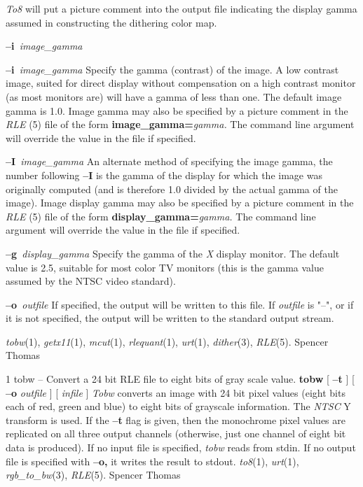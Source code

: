 {\it To8}
will put a picture comment into the output file indicating the display
gamma assumed in constructing the dithering color map.
\begin{TPlist}{{\bf --i}{\it \ image\_gamma}
}
\item[{{\bf --i}{\it \ image\_gamma}
}]
Specify the gamma (contrast) of the image.  A low contrast image,
suited for direct display without compensation on a high contrast
monitor (as most monitors are) will have a gamma of less than one.
The default image gamma is 1.0.  Image gamma may also be specified by
a picture comment in the
{\it RLE} (5)
file of the form
{\bf image\_gamma=}{\it gamma.}
The command line argument will override the value in the file if specified.
\item[{{\bf --I}{\it \ image\_gamma}
}]
An alternate method of specifying the image gamma, the number
following
{\bf --I}
is the gamma of the display for which the image was originally
computed (and is therefore 1.0 divided by the actual gamma of the
image).  Image display gamma may also be specified by
a picture comment in the
{\it RLE} (5)
file of the form
{\bf display\_gamma=}{\it gamma.}
The command line argument will override the value in the file if specified.
\item[{{\bf --g}{\it \ display\_gamma}
}]
Specify the gamma of the 
{\it X}
display monitor.  The default value is 2.5, suitable for most color TV
monitors (this is the gamma value assumed by the NTSC video standard).
\item[{{\bf --o}{\it \ outfile}
}]
If specified, the output will be written to this file.  If 
{\it outfile}
is "--", or if it is not specified, the output will be written to the
standard output stream.
\end{TPlist}
{\it tobw}{\rm (1),}
{\it getx11}{\rm (1),}
{\it mcut}{\rm (1),}
{\it rlequant}{\rm (1),}
{\it urt}{\rm (1),}
{\it dither}{\rm (3),}
{\it RLE}{\rm (5).}
Spencer Thomas
\newpage


%
%
%
 1
tobw -- Convert a 24 bit RLE file to eight bits of gray scale value.
{\bf tobw}
[
{\bf --t}
] [
{\bf --o}
{\it outfile}
] [
{\it infile}
]
{\it Tobw}
converts an image with 24 bit pixel values (eight bits each of red,
green and blue) to eight bits of grayscale information.  The 
{\it NTSC} Y
transform is used.  If the
{\bf --t}
flag is given, then the monochrome pixel values are replicated on all three
output channels (otherwise, just one channel of eight bit data is produced).
If no input file is specified, 
{\it tobw}
reads from stdin.  If no output file is specified with
{\bf --o,}
it writes the result to stdout.
{\it to8}{\rm (1),}
{\it urt}{\rm (1),}
{\it rgb\_to\_bw}{\rm (3),}
{\it RLE}{\rm (5).}
Spencer Thomas


